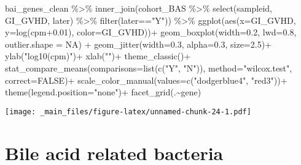 \documentclass[
]{book}
\newenvironment{Shaded}{\begin{snugshade}}{\end{snugshade}}
\newcommand{\AttributeTok}[1]{\textcolor[rgb]{0.77,0.63,0.00}{#1}}
\newcommand{\ConstantTok}[1]{\textcolor[rgb]{0.00,0.00,0.00}{#1}}
\newcommand{\FloatTok}[1]{\textcolor[rgb]{0.00,0.00,0.81}{#1}}
\newcommand{\FunctionTok}[1]{\textcolor[rgb]{0.00,0.00,0.00}{#1}}
\newcommand{\NormalTok}[1]{#1}
\newcommand{\SpecialCharTok}[1]{\textcolor[rgb]{0.00,0.00,0.00}{#1}}
\newcommand{\StringTok}[1]{\textcolor[rgb]{0.31,0.60,0.02}{#1}}
\begin{document}
\begin{Shaded}
\begin{Highlighting}[]
\NormalTok{bai\_genes\_clean }\SpecialCharTok{\%\textgreater{}\%} 
  \FunctionTok{inner\_join}\NormalTok{(cohort\_BAS }\SpecialCharTok{\%\textgreater{}\%} \FunctionTok{select}\NormalTok{(sampleid, GI\_GVHD, later) }\SpecialCharTok{\%\textgreater{}\%} \FunctionTok{filter}\NormalTok{(later}\SpecialCharTok{==}\StringTok{"Y"}\NormalTok{)) }\SpecialCharTok{\%\textgreater{}\%} 
  \FunctionTok{ggplot}\NormalTok{(}\FunctionTok{aes}\NormalTok{(}\AttributeTok{x=}\NormalTok{GI\_GVHD, }\AttributeTok{y=}\FunctionTok{log}\NormalTok{(cpm}\FloatTok{+0.01}\NormalTok{), }\AttributeTok{color=}\NormalTok{GI\_GVHD))}\SpecialCharTok{+}
  \FunctionTok{geom\_boxplot}\NormalTok{(}\AttributeTok{width=}\FloatTok{0.2}\NormalTok{, }\AttributeTok{lwd=}\FloatTok{0.8}\NormalTok{, }\AttributeTok{outlier.shape =} \ConstantTok{NA}\NormalTok{) }\SpecialCharTok{+}
  \FunctionTok{geom\_jitter}\NormalTok{(}\AttributeTok{width=}\FloatTok{0.3}\NormalTok{, }\AttributeTok{alpha=}\FloatTok{0.3}\NormalTok{, }\AttributeTok{size=}\FloatTok{2.5}\NormalTok{)}\SpecialCharTok{+}
  \FunctionTok{ylab}\NormalTok{(}\StringTok{"log10(cpm)"}\NormalTok{)}\SpecialCharTok{+}
  \FunctionTok{xlab}\NormalTok{(}\StringTok{""}\NormalTok{)}\SpecialCharTok{+}
  \FunctionTok{theme\_classic}\NormalTok{()}\SpecialCharTok{+}
  \FunctionTok{stat\_compare\_means}\NormalTok{(}\AttributeTok{comparisons=}\FunctionTok{list}\NormalTok{(}\FunctionTok{c}\NormalTok{(}\StringTok{"Y"}\NormalTok{, }\StringTok{"N"}\NormalTok{)),}
                     \AttributeTok{method=}\StringTok{"wilcox.test"}\NormalTok{,}
                     \AttributeTok{correct=}\ConstantTok{FALSE}\NormalTok{)}\SpecialCharTok{+}
  \FunctionTok{scale\_color\_manual}\NormalTok{(}\AttributeTok{values=}\FunctionTok{c}\NormalTok{(}\StringTok{"dodgerblue4"}\NormalTok{, }\StringTok{"red3"}\NormalTok{))}\SpecialCharTok{+}
  \FunctionTok{theme}\NormalTok{(}\AttributeTok{legend.position=}\StringTok{"none"}\NormalTok{)}\SpecialCharTok{+}
  \FunctionTok{facet\_grid}\NormalTok{(.}\SpecialCharTok{\textasciitilde{}}\NormalTok{gene)}
\end{Highlighting}
\end{Shaded}

\texttt{[image: \_main\_files/figure-latex/unnamed-chunk-24-1.pdf]}

\hypertarget{bile-acid-related-bacteria}{%
\section{Bile acid related bacteria}\label{bile-acid-related-bacteria}}
\end{document}
